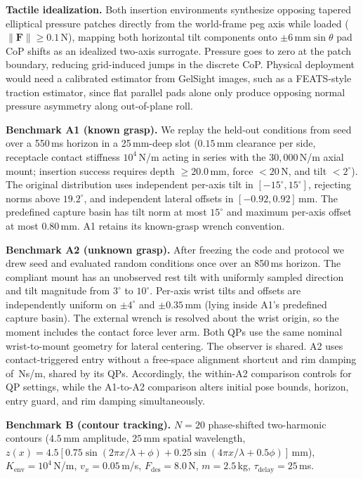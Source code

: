\documentclass[letterpaper,10pt,conference]{IEEEtran}
\begin{document}
\textbf{Tactile idealization.} Both insertion environments synthesize opposing tapered elliptical pressure patches directly from the world-frame peg axis while loaded ($\|\mathbf F\|\ge0.1$\,N), mapping both horizontal tilt components onto $\pm6\,\mathrm{mm}\sin\theta$ pad CoP shifts as an idealized two-axis surrogate. Pressure goes to zero at the patch boundary, reducing grid-induced jumps in the discrete CoP. Physical deployment would need a calibrated estimator from GelSight images, such as a FEATS-style traction estimator, since flat parallel pads alone only produce opposing normal pressure asymmetry along out-of-plane roll.

\textbf{Benchmark A1 (known grasp).} We replay the \HeldN{} held-out conditions from seed \HeldSeed{} over a 550\,ms horizon in a 25\,mm-deep slot ($0.15$\,mm clearance per side, receptacle contact stiffness $10^4$\,N/m acting in series with the $30{,}000$\,N/m axial mount; insertion success requires depth $\ge20.0$\,mm, force $<20$\,N, and tilt $<2^\circ$). The original distribution uses independent per-axis tilt in $[-15^\circ,15^\circ]$, rejecting norms above $19.2^\circ$, and independent lateral offsets in $[-0.92,0.92]$\,mm. The predefined capture basin has tilt norm at most $15^\circ$ and maximum per-axis offset at most 0.80\,mm. A1 retains its known-grasp wrench convention.

\textbf{Benchmark A2 (unknown grasp).} After freezing the code and protocol we drew seed \UnknownSeed{} and evaluated \HeldN{} random conditions once over an 850\,ms horizon. The compliant mount has an unobserved rest tilt with uniformly sampled direction and tilt magnitude from $3^\circ$ to $10^\circ$. Per-axis wrist tilts and offsets are independently uniform on $\pm4^\circ$ and $\pm0.35$\,mm (lying inside A1's predefined capture basin). The external wrench is resolved about the wrist origin, so the moment includes the contact force lever arm. Both QPs use the same nominal wrist-to-mount geometry for lateral centering. The observer is shared. A2 uses contact-triggered entry without a free-space alignment shortcut and rim damping of \UnknownRimDamping\,Ns/m, shared by its QPs. Accordingly, the within-A2 comparison controls for QP settings, while the A1-to-A2 comparison alters initial pose bounds, horizon, entry guard, and rim damping simultaneously.

\textbf{Benchmark B (contour tracking).} $N=20$ phase-shifted two-harmonic contours ($4.5$\,mm amplitude, $25$\,mm spatial wavelength, $z(x)=4.5[0.75\sin(2\pi x/\lambda+\phi)+0.25\sin(4\pi x/\lambda+0.5\phi)]$\,mm), $K_{\mathrm{env}}=10^4$\,N/m, $v_x=0.05$\,m/s, $F_{\mathrm{des}}=8.0$\,N, $m=2.5$\,kg, $\tau_{\mathrm{delay}}=25$\,ms.
\end{document}

